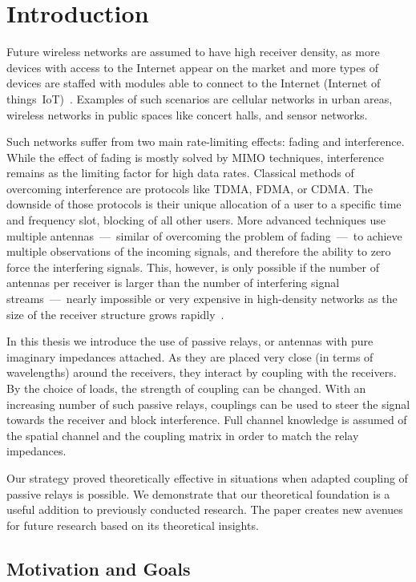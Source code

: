 \chapter{Introduction}
\label{sec:introduction}

Future wireless networks are assumed to have high receiver density, as more devices with access to the Internet appear on the market and more types of devices are staffed with modules able to connect to the Internet (Internet of things~IoT)~\cite{rusek13}.
Examples of such scenarios are cellular networks in urban areas, wireless networks in public spaces like concert halls, and sensor networks.

Such networks  suffer from two main rate-limiting  effects: fading and interference.
While the effect of fading is mostly solved by MIMO techniques, interference remains as the limiting factor for high data rates.
Classical methods of overcoming interference are protocols like TDMA, FDMA, or CDMA.
The downside of those protocols is their unique allocation of a user to a specific time and frequency slot, blocking of all other users.
More advanced techniques use multiple antennas~---~similar of overcoming the problem of fading~---~to achieve multiple observations of the incoming signals, and therefore the ability to zero force the interfering signals.
This, however, is only possible if the number of antennas per receiver is larger than the number of interfering signal streams~---~nearly impossible or very expensive in high-density networks as the size of the receiver structure grows rapidly~\cite{rusek13}.

In this thesis we introduce the use of passive relays, or antennas with pure imaginary impedances attached.
As they are placed very close (in terms of wavelengths) around the receivers, they interact by  coupling with the receivers.
By the choice of loads, the strength of coupling can be changed.
With an increasing number of such passive relays, couplings can be used to steer the signal towards the receiver and block interference.
Full channel knowledge is assumed of the spatial channel and the coupling matrix in order to match the relay impedances.

Our strategy proved theoretically effective in situations when adapted coupling of passive relays is possible.
We demonstrate that our theoretical foundation is a useful addition to previously conducted research.
The paper creates new avenues for future research based on its theoretical insights.

\section{Motivation and Goals}
\label{sec:motivation}

